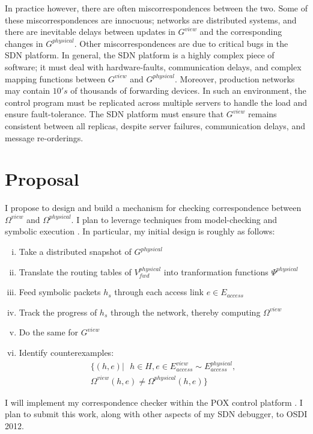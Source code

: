 \documentclass{sig-alternate-10pt}
\begin{document}
In practice however, there are often miscorrespondences between the two. Some
of these miscorrespondences are innocuous; networks are distributed systems,
and there are inevitable delays between updates in $G^{view}$ and the
corresponding changes in $G^{physical}$. Other miscorrespondences are
due to critical bugs in the SDN platform. In general, the SDN platform is a
highly complex piece of software; it must deal with hardware-faults,
communication delays, and complex mapping functions  between $G^{view}$ and
$G^{physical}$. Moreover, production networks may contain  $10's$ of thousands of
forwarding devices. In such an environment, the control program must be
replicated across multiple servers to handle the load and ensure
fault-tolerance. The SDN platform must ensure that $G^{view}$ remains consistent
between all replicas, despite server failures, communication delays, and
message re-orderings.

\section{Proposal}

I propose to design and build a mechanism for checking 
correspondence between $\Omega^{view}$ and $\Omega^{physical}$.
I plan to leverage techniques from model-checking and symbolic execution \cite{symbolicmodel}.
In particular, my initial design is roughly as follows:
\begin{enumerate}[i.]
\item Take a distributed snapshot of $G^{physical}$ \cite{distributedsnapshots}
\item Translate the routing tables of $V_{fwd}^{physical}$ into tranformation
functions $\Psi^{physical}$
\item Feed symbolic packets $h_s$ through each access link $e \in E_{access}$
\item Track the progress of $h_s$ through the network, thereby computing
$\Omega^{view}$
\item Do the same for $G^{view}$
\item Identify counterexamples:
\begin{align*}
 \{ (h,e) |\text{ } h \in H, e \in E^{view}_{access} \sim
 E^{physical}_{access}, \\
 \Omega^{view}(h,e) \neq  \Omega^{physical}(h,e) \}
\end{align*}
\end{enumerate}

I will implement my correspondence checker within the POX control platform
\cite{POX}.
I plan to submit this work, along with other aspects of my SDN debugger, to
OSDI 2012.

\scriptsize



%
\end{document}
